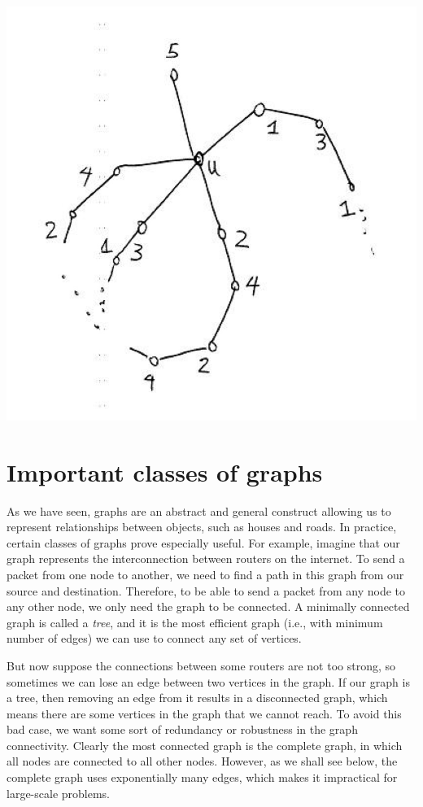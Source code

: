 \documentclass[11pt]{article}
\begin{document}
\includegraphics[scale=.6]{figures/graphs_4}



\section{Important classes of graphs}\label{scn:types}


As we have seen, graphs are an abstract and general construct allowing us to represent relationships between objects, such as houses and roads. In practice, certain classes of graphs prove especially useful. For example, imagine that our graph represents the interconnection between routers on the internet. To send a packet from one node to another, we need to find a path in this graph from our source and destination. Therefore, to be able to send a packet from any node to any other node, we only need the graph to be connected. A minimally connected graph is called a {\em tree}, and it is the most efficient graph (i.e., with minimum number of edges) we can use to connect any set of vertices.

But now suppose the connections between some routers are not too strong, so sometimes we can lose an edge between two vertices in the graph. If our graph is a tree, then removing an edge from it results in a disconnected graph, which means there are some vertices in the graph that we cannot reach. To avoid this bad case, we want some sort of redundancy or robustness in the graph connectivity. Clearly the most connected graph is the complete graph, in which all nodes are connected to all other nodes. However, as we shall see below, the complete graph uses exponentially many edges, which makes it impractical for large-scale problems.
\end{document}
